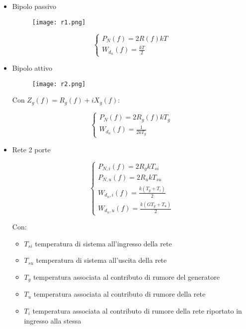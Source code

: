 \documentclass{article}
\begin{document}
\begin{itemize}
    \item Bipolo passivo

    \begin{figure}[ht]
        \centering
        \texttt{[image: r1.png]}
    \end{figure}

    \[\begin{cases}
         P_N(f)=2R(f)kT\\
        \displaystyle W_{d_n}(f)=\frac{kT}{2}
    \end{cases}\]

    \item Bipolo attivo

    \begin{figure}[ht]
        \centering
        \texttt{[image: r2.png]}
    \end{figure}

    Con $Z_g(f)=R_g(f)+iX_g(f)$:

    \[\begin{cases}
         P_N(f)=2R_g(f)kT_g\\
        \displaystyle W_{d_n}(f)=\frac{1}{2kT_g}
    \end{cases}\]

    \item Rete 2 porte

    \[\begin{cases}
        \displaystyle P_{N,i}(f)=2R_gkT_{si}\\
        \displaystyle P_{N,u}(f)=2R_ukT_{su}\\
         W_{d_n,i}(f)=\frac{\displaystyle k(T_g+T_i)}{2}\\
         W_{d_n,u}(f)=\frac{\displaystyle k(GT_g+T_u)}{2}
    \end{cases}\]

    Con:
    \begin{itemize}
        \item $T_{si}$ temperatura di sistema all'ingresso della rete
        \item $T_{su}$ temperatura di sistema all'uscita della rete
        \item $T_g$ temperatura associata al contributo di rumore del generatore
        \item $T_u$ temperatura associata al contributo di rumore della rete
        \item $T_i$ temperatura associata al contributo di rumore della rete riportato in ingresso alla stessa\newline
    \end{itemize}


\end{itemize}
\end{document}
